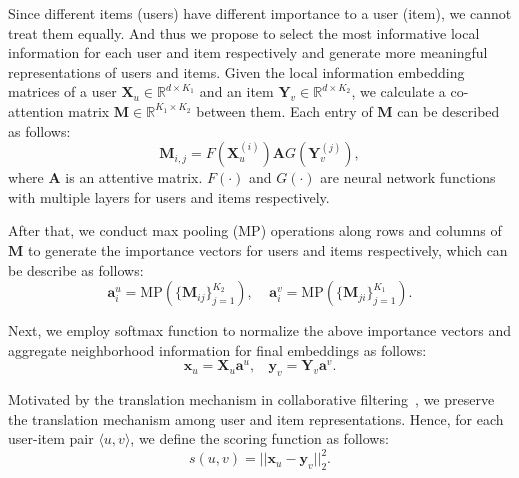 
Since different items (users) have different importance to a user (item), we cannot treat them equally. And thus we propose to select the most informative local information for each user and item respectively and generate more meaningful representations of users and items. Given the local information embedding matrices of a user $\bm{X}_u \in \mathbb{R}^{d \times K_1}$ and an item $\bm{Y}_v \in \mathbb{R}^{d \times K_2}$, we calculate a co-attention matrix $\bm{M} \in \mathbb{R}^{K_1 \times K_2}$ between them. Each entry of $\bm{M}$ can be described as follows:
\begin{equation}
\bm{M}_{i,j} = F(\bm{X}_u^{(i)})\bm{A}G(\bm{Y}_v^{(j)}),
\end{equation}
where $\bm{A}$ is an attentive matrix. %
$F(\cdot)$ and $G(\cdot)$ are neural network functions with multiple layers for users and items respectively.

After that, we conduct max pooling (MP) operations along rows and columns of $\bm{M}$ to generate the importance vectors for users and items respectively, which can be describe as follows:
\begin{equation}
\bm{a}^u_i = \text{MP}(\{\bm{M}_{ij}\}_{j = 1}^{K_2}),\ \ \ \ \ \bm{a}^v_i = \text{MP}(\{\bm{M}_{ji}\}_{j = 1}^{K_1}).
\end{equation}

Next, we employ softmax function to normalize the above importance vectors and aggregate neighborhood information for final embeddings as follows:
\begin{equation}
\bm{x}_u = \bm{X}_u\bm{a}^u,\ \ \ \ \bm{y}_v = \bm{Y}_v\bm{a}^v.
\end{equation}

Motivated by the translation mechanism in collaborative filtering~\cite{tay2018latent}, %
we preserve the translation mechanism among user and item representations. Hence, for each user-item pair $\langle u, v\rangle$, we define the scoring function as follows:
\begin{equation}
\label{eq-basic}
s(u, v) = ||\bm{x}_u - \bm{y}_v||_2^2.
\end{equation}

